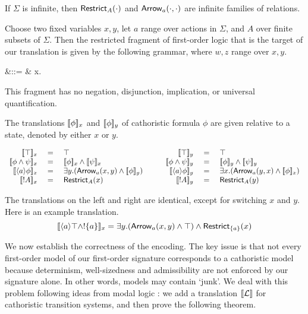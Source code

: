 \NI If $\Sigma$ is infinite, then $\mathsf{Restrict}_{A}(\cdot)$ and
$\mathsf{Arrow}_{a}(\cdot, \cdot)$ are infinite families of relations.

\begin{definition}
 Choose two fixed variables $x, y$, let $a$ range over actions in
$\Sigma$, and $A$ over finite subsets of $\Sigma$. Then the restricted
fragment of first-order logic that is the target of our translation is given by the
following grammar, where $w, z$ range over $x, y$.

\begin{GRAMMAR}
  \phi 
     &\quad ::= \quad&
  \top \fOr {}\fOr {} \fOr \phi \AND \psi \fOr \exists x. \phi 
\end{GRAMMAR}

\end{definition}

\NI This fragment has no negation, disjunction, implication, or
universal quantification.

\begin{definition}
The translations $\lbrack\!\lbrack \phi \rbrack\!\rbrack_x$ and $\lbrack\!\lbrack \phi \rbrack\!\rbrack_y$ of cathoristic formula 
$\phi$ are given relative to a state, denoted by either $x$ or $y$.

\[
\begin{array}{rclcrcl}
  \SEMB{\top}_x & \ = \ & \top  
     &\quad& 
  \SEMB{\top}_y & \ = \ & \top 
     \\
  \SEMB{\phi \AND \psi}_x & = & \SEMB{\phi}_x \AND \SEMB{\psi}_x  
     && 
  \SEMB{\phi \AND \psi}_y & = & \SEMB{\phi}_y \AND \SEMB{\psi}_y  
     \\
  \SEMB{\langle a \rangle \phi}_x & = & \exists y.(\ARROW{a}{x}{y} \AND \SEMB{\phi}_y)  
     &&
  \SEMB{\langle a \rangle \phi}_y & = & \exists x.(\ARROW{a}{y}{x} \AND \SEMB{\phi}_x)  
     \\
  \SEMB{\fBang A}_x & = & \RESTRICT{A}{x}
     &&
  \SEMB{\fBang A}_y & = & \RESTRICT{A}{y}
\end{array}
\]

\end{definition}

\NI The translations on the left and right are identical, except for
switching $x$ and $y$. Here is an example translation.
\[
   \lbrack\!\lbrack \langle a \rangle \top \land ! \{a\} \rbrack\!\rbrack_x 
      = 
   \exists y.(\mathsf{Arrow}_{a}(x, y) \land \top ) \land \mathsf{Restrict}_{\{a\}}(x)
\]

\NI We now establish the correctness of the encoding. The key issue is
that not every first-order model of our first-order signature
corresponds to a cathoristic model because determinism, well-sizedness and
admissibility are not enforced by our signature alone. In other words,
models may contain `junk'.  We deal with this problem following ideas
from modal logic \cite{BlackburnP:modlog}: we add a translation
$\lbrack\!\lbrack \mathcal{L} \rbrack\!\rbrack$ for cathoristic transition systems, and then prove the
following theorem.

